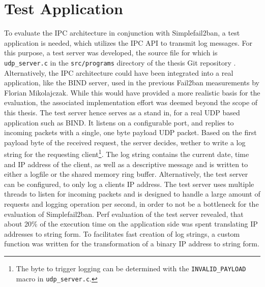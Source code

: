 \section{Test Application} \label{sec:test_server}

To evaluate the \ac{IPC} architecture in conjunction with Simplefail2ban, a test application is needed, which utilizes the \ac{IPC} API to transmit log
messages. For this purpose, a test server was developed, the source file for which is \texttt{udp\_server.c} in the \texttt{src/programs} directory of the thesis Git repository \cite{gitlab}. 
Alternatively, the \ac{IPC} architecture could have been integrated into a real application, like the BIND server, used in the previous Fail2ban measurements by Florian Mikolajczak. While this would have provided a more 
realistic basis for the evaluation, the associated implementation effort was deemed beyond the scope of this thesis. 
The test server hence serves as a stand in, for a real \ac{UDP} based application such as BIND. It listens on a configurable port,
and replies to incoming packets with a single, one byte payload UDP packet. Based on the first payload byte of the received request,
the server decides, wether to write a log string for the requesting client\footnote{The byte to trigger logging can be determined with the \texttt{INVALID\_PAYLOAD} macro in \texttt{udp\_server.c}.}.
The log string contains the current date, time and \ac{IP} address of the client, as well as a descriptive message and is written to either a logfile or the shared memory ring buffer.  
Alternatively, the test server can be configured, to only log a clients \ac{IP} address. The test server uses multiple threads to listen for incoming packets 
and is designed to handle a large amount of requests and logging operation per second, in order to not be a bottleneck for the evaluation of Simplefail2ban. 
Perf \cite{perf} evaluation of the test server revealed, that about 20\% of the execution time on the application side was spent translating \ac{IP} addresses to string form.  
To facilitates fast creation of log strings, a custom function was written for the transformation of a binary \ac{IP} address to string form. 
